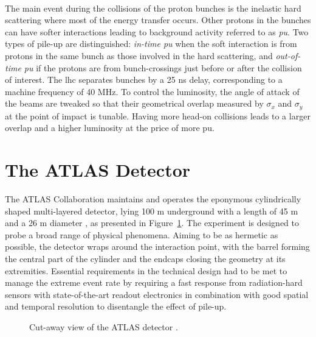 \paragraph{}The main event during the collisions of the proton bunches is the inelastic hard scattering where most of the energy transfer occurs. Other protons in the bunches can have softer interactions leading to background activity referred to as \textit{\gls{pu}}. Two types of pile-up are distinguished: \textit{in-time \gls{pu}} when the soft interaction is from protons in the same bunch as those involved in the hard scattering, and \textit{out-of-time \gls{pu}} if the protons are from bunch-crossings just before or after the collision of interest. The \gls{lhc} separates bunches by a 25 ns delay, corresponding to a machine frequency of 40 MHz. To control the luminosity, the angle of attack of the beams are tweaked so that their geometrical overlap measured by $\sigma_x$ and $\sigma_y$ at the point of impact is tunable. Having more head-on collisions leads to a larger overlap and a higher luminosity at the price of more \gls{pu}. 

\section{The ATLAS Detector}\label{sec-ATLASDet}
The ATLAS Collaboration maintains and operates the eponymous cylindrically shaped multi-layered detector, lying 100 m underground with a length of 45 m and a 26 m diameter \cite{TheATLASCollaboration_2008}, as presented in Figure~\ref{fig-AtlasDec}. The experiment is designed to probe a broad range of physical phenomena. Aiming to be as hermetic as possible, the detector wraps around the interaction point, with the barrel forming the central part of the cylinder and the endcaps closing the geometry at its extremities. Essential requirements in the technical design had to be met to manage the extreme event rate by requiring a fast response from radiation-hard sensors with state-of-the-art readout electronics in combination with good spatial and temporal resolution to disentangle the effect of pile-up. 

\begin{figure}[!h]
\centering
\hspace{-1.25cm}
\caption{Cut-away view of the ATLAS detector \cite{ATLASschematics}.}
\label{fig-AtlasDec}
\end{figure}

